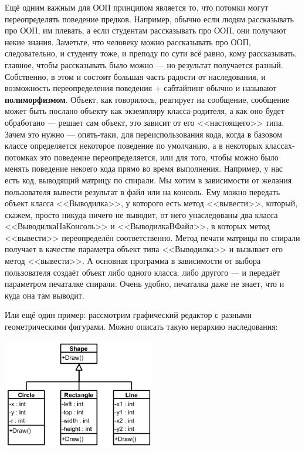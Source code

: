 \documentclass{../../text-style}
\begin{document}
Ещё одним важным для ООП принципом является то, что потомки могут переопределять поведение предков. Например, обычно если людям рассказывать про ООП, им плевать, а если студентам рассказывать про ООП, они получают некие знания. Заметьте, что человеку можно рассказывать про ООП, следовательно, и студенту тоже, и преподу по сути всё равно, кому рассказывать, главное, чтобы рассказывать было можно --- но результат получается разный. Собственно, в этом и состоит большая часть радости от наследования, и возможность переопределения поведения + сабтайпинг обычно и называют \textbf{полиморфизмом}. Объект, как говорилось, реагирует на сообщение, сообщение может быть послано объекту как экземпляру класса-родителя, а как оно будет обработано --- решает сам объект, это зависит от его <<настоящего>> типа. Зачем это нужно --- опять-таки, для переиспользования кода, когда в базовом классе определяется некоторое поведение по умолчанию, а в некоторых классах-потомках это поведение переопределяется, или для того, чтобы можно было менять поведение некоего кода прямо во время выполнения. Например, у нас есть код, выводящий матрицу по спирали. Мы хотим в зависимости от желания пользователя вывести результат в файл или на консоль. Ему можно передать объект класса <<Выводилка>>, у которого есть метод <<вывести>>, который, скажем, просто никуда ничего не выводит, от него унаследованы два класса <<ВыводилкаНаКонсоль>> и <<ВыводилкаВФайл>>, в которых метод <<вывести>> переопределён соответственно. Метод печати матрицы по спирали получает в качестве параметра объект типа <<Выводилка>> и вызывает его метод <<вывести>>. А основная программа в зависимости от выбора пользователя создаёт объект либо одного класса, либо другого --- и передаёт параметром печаталке спирали. Очень удобно, печаталка даже не знает, что и куда она там выводит.

Или ещё один пример: рассмотрим графический редактор с разными геометрическими фигурами. Можно описать такую иерархию наследования:

\begin{center}
    \includegraphics[width=0.5\textwidth]{polymorphism.png}
\end{center}
\end{document}

